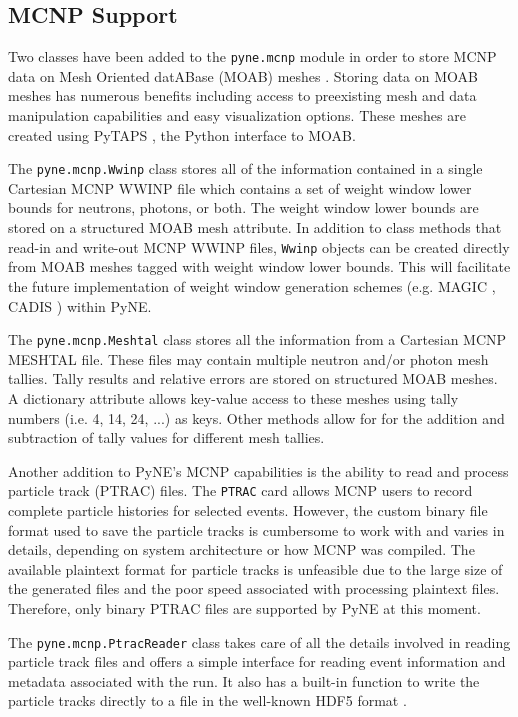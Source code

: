 \documentclass{ansconf}
\begin{document}
\subsection{MCNP Support}

Two classes have been added to the \texttt{pyne.mcnp} module in order to store
MCNP data on Mesh Oriented datABase (MOAB) meshes \cite{tautges_moab:_2004}.
Storing data on MOAB meshes has numerous benefits including access to preexisting
mesh and data manipulation capabilities and easy visualization options. These
meshes are created using PyTAPS \cite{pytaps}, the Python interface to MOAB.

The \texttt{pyne.mcnp.Wwinp} class stores all of the information contained in a
single Cartesian MCNP WWINP file which contains a set of weight window lower
bounds for neutrons, photons, or both. The weight window lower bounds are
stored on a structured MOAB mesh attribute. In addition to class methods that
read-in and write-out MCNP WWINP files, \texttt{Wwinp} objects can be created
directly from MOAB meshes tagged with weight window lower bounds. This will
facilitate the future implementation of weight window generation schemes (e.g.
MAGIC \cite{davis_comparison_2011}, CADIS \cite{haghighat_monte_2003}) within
PyNE.

The \texttt{pyne.mcnp.Meshtal} class stores all the information from a Cartesian
MCNP MESHTAL file. These files may contain multiple neutron and/or photon mesh
tallies.  Tally results and relative errors are stored on structured MOAB
meshes. A dictionary attribute allows key-value access to these meshes using
tally numbers (i.e. 4, 14, 24, ...) as keys. Other methods allow for for the
addition and subtraction of tally values for different mesh tallies.

Another addition to PyNE's MCNP capabilities is the ability to read and
process particle track (PTRAC) files. The \texttt{PTRAC} card allows MCNP
users to record complete particle histories for selected events. However,
the custom binary file format used to save the particle tracks is cumbersome
to work with and varies in details, depending on system architecture or
how MCNP was compiled. The available plaintext format for particle
tracks is unfeasible due to the large size of the generated files and the
poor speed associated with processing plaintext files. Therefore, only
binary PTRAC files are supported by PyNE at this moment.

The \texttt{pyne.mcnp.PtracReader} class takes care of all the details
involved in reading particle track files and offers a simple interface
for reading event information and metadata associated with the run.
It also has a built-in function to write the particle tracks directly
to a file in the well-known HDF5 format \cite{hdf5}.
\end{document}
